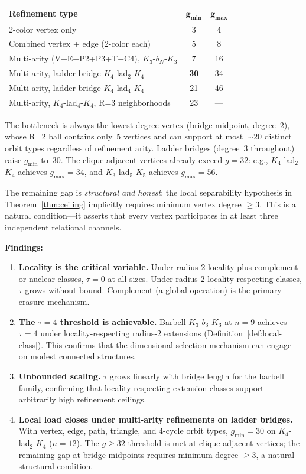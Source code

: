 \documentclass[11pt,a4paper]{article}
\theoremstyle{definition}
\theoremstyle{remark}
\begin{document}
\begin{center}
\begin{tabular}{lcc}
\toprule
\textbf{Refinement type} & $\boldsymbol{g_{\min}}$ & $\boldsymbol{g_{\max}}$ \\
\midrule
2-color vertex only & 3 & 4 \\
Combined vertex + edge (2-color each) & 5 & 8 \\
Multi-arity (V+E+P2+P3+T+C4), $K_3$-$b_N$-$K_3$ & 7 & 16 \\
Multi-arity, ladder bridge $K_4$-lad$_2$-$K_4$ & \textbf{30} & 34 \\
Multi-arity, ladder bridge $K_4$-lad$_4$-$K_4$ & 21 & 46 \\
Multi-arity, $K_4$-lad$_4$-$K_4$, R=3 neighborhoods & 23 & --- \\
\bottomrule
\end{tabular}
\end{center}

The bottleneck is always the lowest-degree vertex (bridge midpoint, degree~2), whose R=2 ball contains only~5 vertices and can support at most~${\sim}20$ distinct orbit types regardless of refinement arity. Ladder bridges (degree~3 throughout) raise $g_{\min}$ to~30. The clique-adjacent vertices already exceed $g = 32$: e.g., $K_4$-lad$_2$-$K_4$ achieves $g_{\max} = 34$, and $K_3$-lad$_5$-$K_5$ achieves $g_{\max} = 56$.

The remaining gap is \emph{structural and honest}: the local separability hypothesis in Theorem~\ref{thm:ceiling} implicitly requires minimum vertex degree $\geq 3$. This is a natural condition---it asserts that every vertex participates in at least three independent relational channels.

\textbf{Findings:}
\begin{enumerate}[nosep]
  \item \textbf{Locality is the critical variable.} Under radius-2 locality plus complement or nuclear classes, $\tau = 0$ at all sizes. Under radius-2 locality-respecting classes, $\tau$ grows without bound. Complement (a global operation) is the primary erasure mechanism.
  \item \textbf{The $\tau = 4$ threshold is achievable.} Barbell $K_3\text{-}b_3\text{-}K_3$ at $n = 9$ achieves $\tau = 4$ under locality-respecting radius-$2$ extensions (Definition~\ref{def:local-class}). This confirms that the dimensional selection mechanism can engage on modest connected structures.
  \item \textbf{Unbounded scaling.} $\tau$ grows linearly with bridge length for the barbell family, confirming that locality-respecting extension classes support arbitrarily high refinement ceilings.
  \item \textbf{Local load closes under multi-arity refinements on ladder bridges.} With vertex, edge, path, triangle, and 4-cycle orbit types, $g_{\min} = 30$ on $K_4$-lad$_2$-$K_4$ ($n = 12$). The $g \geq 32$ threshold is met at clique-adjacent vertices; the remaining gap at bridge midpoints requires minimum degree $\geq 3$, a natural structural condition.
\end{enumerate}
\end{document}
